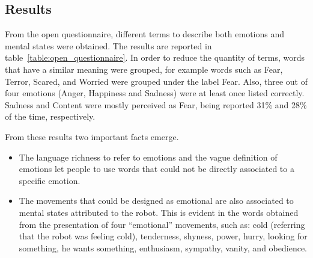 \subsection{Results}

From the open questionnaire, different terms to describe both emotions and mental states were obtained. The results are reported in table~\ref{table:open_questionnaire}. In order to reduce the quantity of terms, words that have a similar meaning were grouped, for example words such as Fear, Terror, Scared, and Worried were grouped under the label Fear. Also, three out of four emotions (Anger, Happiness and Sadness) were at least once listed correctly. Sadness and Content were mostly perceived as Fear, being reported 31\% and 28\% of the time, respectively.

From these results two important facts emerge.

\begin{itemize}
	
	\item The language richness to refer to emotions and the vague definition of emotions let people to use words that could not be directly associated to a specific emotion. 
	
	\item The movements that could be designed as emotional are also associated to mental states attributed to the robot. This is evident in the words obtained from the presentation of four ``emotional'' movements, such as: cold (referring that the robot was feeling cold), tenderness, shyness, power, hurry, looking for something, he wants something, enthusiasm, sympathy, vanity, and obedience. 
	
\end{itemize}

